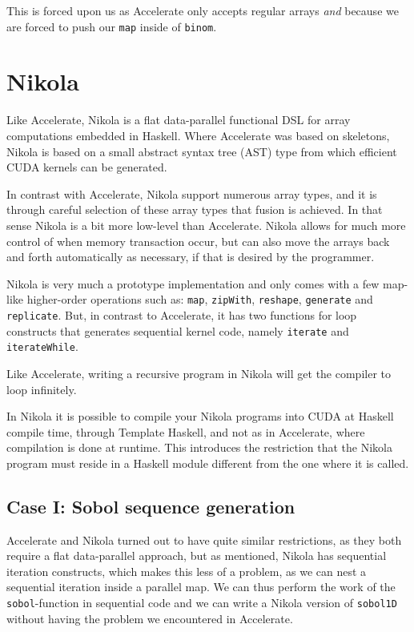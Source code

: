 \documentclass[preprint]{sigplanconf}
\begin{document}
This is forced upon us as Accelerate only accepts regular arrays
\emph{and} because we are forced to push our \texttt{map} inside of
\verb|binom|.


\section{Nikola}
Like Accelerate, Nikola is a flat data-parallel functional DSL for
array computations embedded in Haskell. Where Accelerate was based on
skeletons, Nikola is based on a small abstract syntax tree (AST) type
from which efficient CUDA kernels can be generated.

In contrast with Accelerate, Nikola support numerous array types, and
it is through careful selection of these array types that fusion is
achieved. In that sense Nikola is a bit more low-level than
Accelerate. Nikola allows for much more control of when memory
transaction occur, but can also move the arrays back and forth
automatically as necessary, if that is desired by the programmer.

Nikola is very much a prototype implementation and only comes with a
few map-like higher-order operations such as: \verb|map|,
\verb|zipWith|, \verb|reshape|, \verb|generate| and \verb|replicate|.
But, in contrast to Accelerate, it has two functions for loop
constructs that generates sequential kernel code, namely
\verb|iterate| and \verb|iterateWhile|.

Like Accelerate, writing a recursive program in Nikola will get the
compiler to loop infinitely.

In Nikola it is possible to compile your Nikola programs into CUDA at
Haskell compile time, through Template Haskell, and not as in
Accelerate, where compilation is done at runtime. This introduces the
restriction that the Nikola program must reside in a Haskell module
different from the one where it is called.

\subsection{Case I: Sobol sequence generation}
Accelerate and Nikola turned out to have quite similar restrictions,
as they both require a flat data-parallel approach, but as mentioned,
Nikola has sequential iteration constructs, which makes this less of a
problem, as we can nest a sequential iteration inside a parallel
map. We can thus perform the work of the \verb|sobol|-function in
sequential code and we can write a Nikola version of \verb|sobol1D|
without having the problem we encountered in Accelerate.
\end{document}
